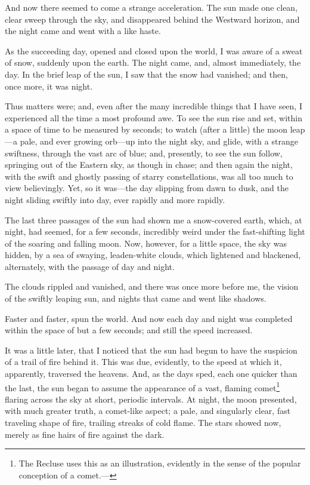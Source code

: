 And now there seemed to come a strange acceleration. The sun made one clean, clear sweep through the sky, and disappeared behind the Westward horizon, and the night came and went with a like haste.

As the succeeding day, opened and closed upon the world, I was aware of a sweat of snow, suddenly upon the earth. The night came, and, almost immediately, the day. In the brief leap of the sun, I saw that the snow had vanished; and then, once more, it was night.

Thus matters were; and, even after the many incredible things that I have seen, I experienced all the time a most profound awe. To see the sun rise and set, within a space of time to be measured by seconds; to watch (after a little) the moon leap---a pale, and ever growing orb---up into the night sky, and glide, with a strange swiftness, through the vast arc of blue; and, presently, to see the sun follow, springing out of the Eastern sky, as though in chase; and then again the night, with the swift and ghostly passing of starry constellations, was all too much to view believingly. Yet, so it was---the day slipping from dawn to dusk, and the night sliding swiftly into day, ever rapidly and more rapidly.

The last three passages of the sun had shown me a snow-covered earth, which, at night, had seemed, for a few seconds, incredibly weird under the fast-shifting light of the soaring and falling moon. Now, however, for a little space, the sky was hidden, by a sea of swaying, leaden-white clouds, which lightened and blackened, alternately, with the passage of day and night.

The clouds rippled and vanished, and there was once more before me, the vision of the swiftly leaping sun, and nights that came and went like shadows.

Faster and faster, spun the world. And now each day and night was completed within the space of but a few seconds; and still the speed increased.

It was a little later, that I noticed that the sun had begun to have the suspicion of a trail of fire behind it. This was due, evidently, to the speed at which it, apparently, traversed the heavens. And, as the days sped, each one quicker than the last, the sun began to assume the appearance of a vast, flaming comet\footnote{The Recluse uses this as an illustration, evidently in the sense of the popular conception of a comet.---} flaring across the sky at short, periodic intervals. At night, the moon presented, with much greater truth, a comet-like aspect; a pale, and singularly clear, fast traveling shape of fire, trailing streaks of cold flame. The stars showed now, merely as fine hairs of fire against the dark.

